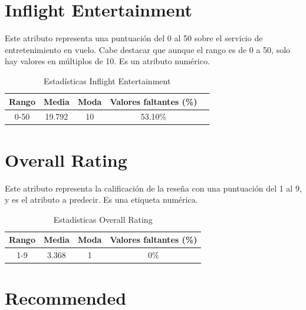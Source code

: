 \documentclass[12pt]{report} %
\begin{document}
    \section{Inflight Entertainment}

    Este atributo representa una puntuación del 0 al 50 sobre el servicio de entretenimiento
    en vuelo. Cabe destacar que aunque el rango es de 0 a 50, solo hay valores en múltiplos de 10.
    Es un atributo numérico.

    \begin{table}[H]
        \begin{center}
            \begin{tabular}{ @{}ccccc@{} }
                \toprule
                Rango & Media & Moda & Valores faltantes (\%) \\
                \midrule
                0-50 & 19.792 & 10 & 53.10\% \\
                \bottomrule
            \end{tabular}
            \caption{Estadísticas Inflight Entertainment}
        \end{center}
    \end{table}

    \section{Overall Rating}

    Este atributo representa la calificación de la reseña con una puntuación del 1
    al 9, y es el atributo a predecir. Es una etiqueta numérica.

    \begin{table}[H]
        \begin{center}
            \begin{tabular}{ @{}cccc@{} }
                \toprule
                Rango & Media & Moda & Valores faltantes (\%) \\
                \midrule
                1-9 & 3.368 & 1 & 0\% \\
                \bottomrule
            \end{tabular}
            \caption{Estadísticas Overall Rating}
        \end{center}
    \end{table}

    \section{Recommended}
     
\end{document}
